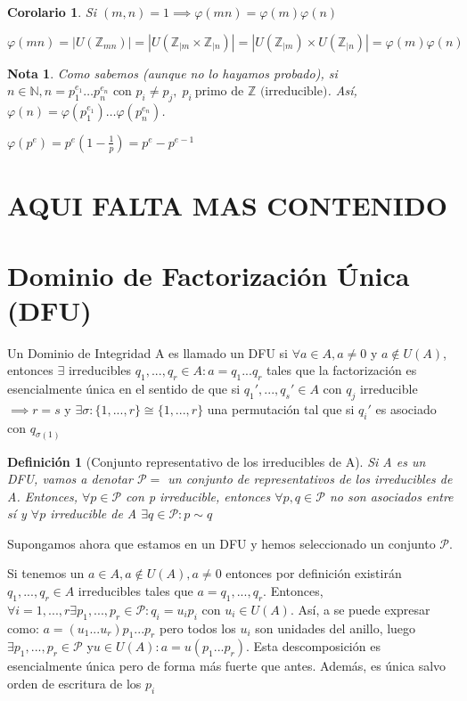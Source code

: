 \documentclass[11pt, a4paper, titlepage]{article}
\makeatletter
\renewenvironment{proof}[1][\proofname] {\vspace{-15pt}\par\pushQED{\qed}\normalfont\topsep6\p@\@plus6\p@\relax\trivlist\item[\hskip\labelsep\it#1\@addpunct{.}]\ignorespaces}{\popQED\endtrivlist\@endpefalse}
\theoremstyle{theorem-style}
\newtheorem{ncor}{Corolario}
\theoremstyle{definition-style}
\newtheorem*{ndef}{Definición}
\theoremstyle{remark-style}
\newtheorem*{nota}{Nota}
\theoremstyle{example-style}
\makeatother
\begin{document}
\begin{ncor}
  Si $(m,n) = 1 \implies \varphi(mn) = \varphi(m)\varphi(n)$
\end{ncor}

\begin{proof}
  $\varphi(mn) = |U(\mathbb{Z}_{mn})| = |U(\mathbb{Z}_{|m}\times\mathbb{Z}_{|n})| = |U(\mathbb{Z}_{|m}) \times U(\mathbb{Z}_{|n})| = \varphi(m)\varphi(n)$
\end{proof}
\begin{nota}
  Como sabemos (aunque no lo hayamos probado), si $n\in \mathbb{N}, n= p_1^{e_1}\dots p_n^{e_n} \text{ con } p_i \ne p_j,\; p_i\ \text{primo de $\mathbb{Z}$ (irreducible)}$. Así, $\varphi(n) = \varphi(p_1^{e_1})\dots\varphi(p_n^{e_n})$.
  
  $\varphi(p^e) = p^e(1-\frac{1}{p}) = p^e-p^{e-1}$
\end{nota}



\section{AQUI FALTA MAS CONTENIDO}

\section{Dominio de Factorización Única (DFU)}

Un Dominio de Integridad A es llamado un DFU si $\forall a \in A, a\ne 0$ y $a\notin U(A)$, entonces $\exists$ irreducibles $q_1 ,...,q_r \in A : a = q_1 ...q_r$ tales que la factorización es esencialmente única en el sentido de que si $q_1' ,...,q_s' \in A $ con $q_j$ irreducible $\implies r = s$ y $\exists \sigma:\{1,...,r\} \cong \{1,...,r\}$ una permutación tal que si $q_i'$ es asociado con $q_{\sigma(1)}$

\begin{ndef}[Conjunto representativo de los irreducibles de A]
	Si A es un DFU, vamos a denotar $\mathcal{P}= $ un conjunto de representativos de los irreducibles de A. Entonces, $\forall p \in \mathcal{P}$ con p irreducible, entonces $\forall p, q \in \mathcal{P}$ no son asociados entre sí y $\forall p $ irreducible de A $ \exists q \in \mathcal{P} : p \sim q$   

\end{ndef}

Supongamos ahora que estamos en un DFU y hemos seleccionado un conjunto $\mathcal{P}$.

Si tenemos un $a\in A, a \notin U(A), a \ne 0$ entonces por definición existirán $q_1 ,...,q_r \in A $ irreducibles tales que $a = q_1 ,...,q_r $. Entonces, $\forall i = 1,...,r \exists p_1,...,p_r \in \mathcal{P} : q_i = u_ip_i $ con $u_i \in U(A)$. Así, a se puede expresar como: $a = (u_1...u_r)p_1...p_r$ pero todos los $u_i$ son unidades del anillo, luego $\exists p_1,...,p_r \in \mathcal{P} $ y$ u \in U(A) : a = u(p_1...p_r)$. Esta descomposición es esencialmente única pero de forma más fuerte que antes. Además, es única salvo orden de escritura de los $p_i$
\end{document}
